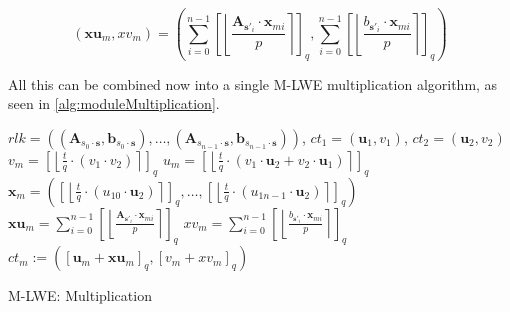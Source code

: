 \begin{equation}
  (\textbf{xu}_m, xv_m) = \left(\sum_{i=0}^{n-1}\left[\left\lfloor\frac{\textbf{A}_{\textbf{s}'_i} \cdot \textbf{x}_{mi}}{p}  \right\rceil \right]_q, \sum_{i=0}^{n-1}\left[\left\lfloor \frac{b_{\textbf{s}'_i} \cdot \textbf{x}_{mi}}{p}  \right\rceil \right]_q\right)
  \label{eq:moduleXmSplitting}
\end{equation}

All this can be combined now into a single M-LWE multiplication algorithm, as seen in \ref{alg:moduleMultiplication}.

\begin{algorithm}[htb]
  \begin{algorithmic}[1]
    \REQUIRE $rlk=((\textbf{A}_{s_0\cdot \textbf{s}}, \textbf{b}_{s_0\cdot \textbf{s}}), \ldots ,(\textbf{A}_{s_{n-1}\cdot \textbf{s}}, \textbf{b}_{s_{n-1}\cdot \textbf{s}}))$, $ct_1 = (\textbf{u}_1, v_1)$, $ct_2 = (\textbf{u}_2, v_2)$
    \STATE $v_m = \left[\left\lfloor \frac{t}{q}\cdot (v_1 \cdot v_2)\right\rceil\right] _q $
    \STATE $u_m = \left[\left\lfloor \frac{t}{q}\cdot(v_1 \cdot \textbf{u}_2 + v_2 \cdot \textbf{u}_1)\right\rceil\right] _q$
    \STATE $\textbf{x}_m = \left(\left[\left\lfloor \frac{t}{q}\cdot(u_{10} \cdot \textbf{u}_2)\right\rceil\right]_q,\ldots, \left[\left\lfloor \frac{t}{q}\cdot(u_{1n-1} \cdot \textbf{u}_2)\right\rceil\right]_q\right) $
    \STATE $\textbf{xu}_m = \sum_{i=0}^{n-1}\left[\left\lfloor\frac{\textbf{A}_{\textbf{s}'_i} \cdot \textbf{x}_{mi}}{p}  \right\rceil \right]_q$
    \STATE $xv_m = \sum_{i=0}^{n-1}\left[\left\lfloor \frac{b_{\textbf{s}'_i} \cdot \textbf{x}_{mi}}{p}  \right\rceil \right]_q$
    \RETURN $ct_m:=(\left[\textbf{u}_m + \textbf{xu}_m\right]_q , \left[v_m + xv_m\right]_q )$
  \end{algorithmic}
  \caption{M-LWE: Multiplication}
  \label{alg:moduleMultiplication}
\end{algorithm}

